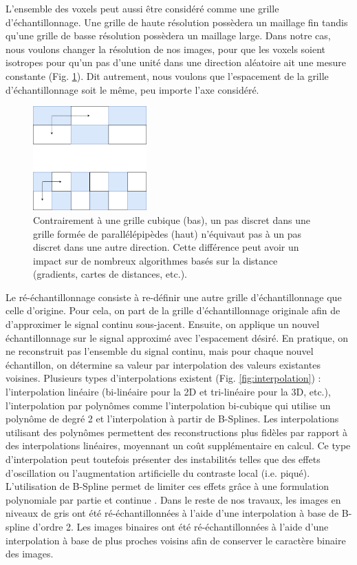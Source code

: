 L'ensemble des voxels peut aussi être considéré comme une grille d'échantillonnage. Une grille de haute résolution possèdera un maillage fin tandis qu'une grille de basse résolution possèdera un maillage large. Dans notre cas, nous voulons changer la résolution de nos images, pour que les voxels soient isotropes pour qu'un pas d'une unité dans une direction aléatoire ait une mesure constante (Fig. \ref{fig:resolution_voxels_shapes}). Dit autrement, nous voulons que l'espacement de la grille d'échantillonnage soit le même, peu importe l'axe considéré.

\begin{figure}[!ht]
  \centering
  \includegraphics[height=4cm]{Images/resolution_voxels_shape.png}
  \caption{Contrairement à une grille cubique (bas), un pas discret dans une grille formée de parallélépipèdes (haut) n'équivaut pas à un pas discret dans une autre direction. Cette différence peut avoir un impact sur de nombreux algorithmes basés sur la distance (gradients, cartes de distances, etc.).}
  \label{fig:resolution_voxels_shapes}
\end{figure}

Le ré-échantillonnage consiste à re-définir une autre grille d'échantillonnage que celle d'origine. Pour cela, on part de la grille d'échantillonnage originale afin de d'approximer le signal continu sous-jacent. Ensuite, on applique un nouvel échantillonnage sur le signal approximé avec l'espacement désiré. En pratique, on ne reconstruit pas l'ensemble du signal continu, mais pour chaque nouvel échantillon, on détermine sa valeur par interpolation des valeurs existantes voisines. Plusieurs types d'interpolations existent (Fig. \ref{fig:interpolation}) : l'interpolation linéaire (bi-linéaire pour la 2D et tri-linéaire pour la 3D, etc.), l'interpolation par polynômes comme l'interpolation bi-cubique qui utilise un polynôme de degré 2 et l'interpolation à partir de B-Splines. Les interpolations utilisant des polynômes permettent des reconstructions plus fidèles par rapport à des interpolations linéaires, moyennant un coût supplémentaire en calcul. Ce type d'interpolation peut toutefois présenter des instabilités telles que des effets d'oscillation ou l'augmentation artificielle du contraste local (i.e. piqué). L'utilisation de B-Spline permet de limiter ces effets grâce à une formulation polynomiale par partie et continue \cite{Unser1993_bspline}. Dans le reste de nos travaux, les images en niveaux de gris ont été ré-échantillonnées à l'aide d'une interpolation à base de B-spline d'ordre 2. Les images binaires ont été ré-échantillonnées à l'aide d'une interpolation à base de plus proches voisins afin de conserver le caractère binaire des images.


